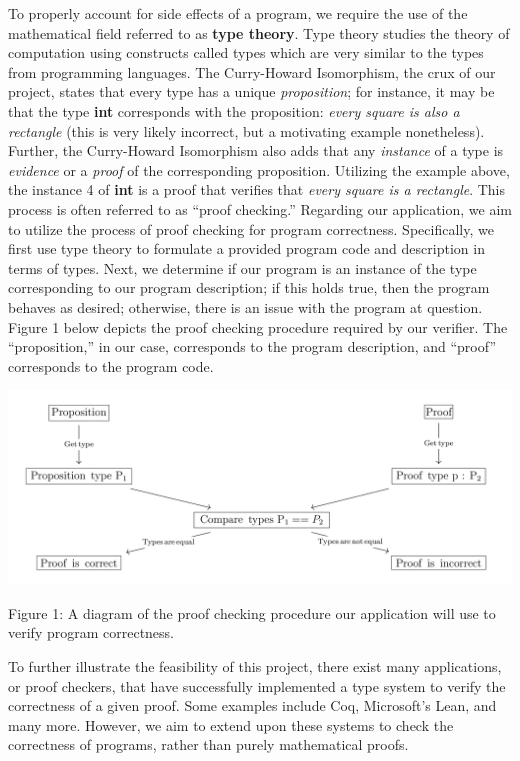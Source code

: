 \documentclass[ 12pt ]{article}
\begin{document}
\qquad To properly account for side effects of a program, we require the use of the mathematical field referred to as \textbf{type theory}. Type theory studies the theory of computation using constructs called types which are very similar to the types from programming languages. The Curry-Howard Isomorphism, the crux of our project, states that every type has a unique \textit{proposition}; for instance, it may be that the type \textbf{int} corresponds with the proposition: \textit{every square is also a rectangle} (this is very likely incorrect, but a motivating example nonetheless). Further, the Curry-Howard Isomorphism also adds that any \textit{instance} of a type is \textit{evidence} or a \textit{proof} of the corresponding proposition. Utilizing the example above, the instance 4 of \textbf{int} is a proof that verifies that \textit{every square is a rectangle}. This process is often referred to as “proof checking.” Regarding our application, we aim to utilize the process of proof checking for program correctness. Specifically, we first use type theory to formulate a provided program code and description in terms of types. Next, we determine if our program is an instance of the type corresponding to our program description; if this holds true, then the program behaves as desired; otherwise, there is an issue with the program at question. Figure 1 below depicts the proof checking procedure required by our verifier. The “proposition,” in our case, corresponds to the program description, and “proof” corresponds to the program code.
\begin{center}
    \includegraphics[scale=0.2]{figure1}
\end{center}
\begin{center}
    \scriptsize
    Figure 1: A diagram of the proof checking procedure  our application will use to verify program correctness.
\end{center}
\qquad To further illustrate the feasibility of this project, there exist many applications, or proof checkers, that have successfully implemented a type system to verify the correctness of a given proof. Some examples include Coq, Microsoft’s Lean, and many more. However, we aim to extend upon these systems to check the correctness of programs, rather than purely mathematical proofs.
\end{document}
